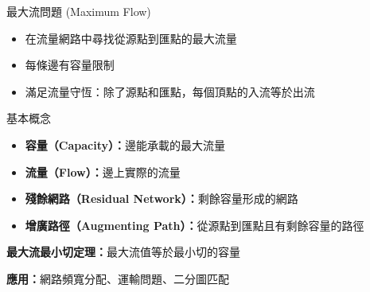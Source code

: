 \documentclass{beamer}
\begin{document}
\begin{frame}{最大流問題 (Maximum Flow)}
\begin{itemize}
    \item 在流量網路中尋找從源點到匯點的最大流量
    \item 每條邊有容量限制
    \item 滿足流量守恆：除了源點和匯點，每個頂點的入流等於出流
\end{itemize}

\vspace{1em}
\begin{block}{基本概念}
\begin{itemize}
    \item \textbf{容量（Capacity）：}邊能承載的最大流量
    \item \textbf{流量（Flow）：}邊上實際的流量
    \item \textbf{殘餘網路（Residual Network）：}剩餘容量形成的網路
    \item \textbf{增廣路徑（Augmenting Path）：}從源點到匯點且有剩餘容量的路徑
\end{itemize}
\end{block}

\vspace{1em}
\textbf{最大流最小切定理：}最大流值等於最小切的容量

\vspace{1em}
\textbf{應用：}網路頻寬分配、運輸問題、二分圖匹配
\end{frame}
\end{document}
